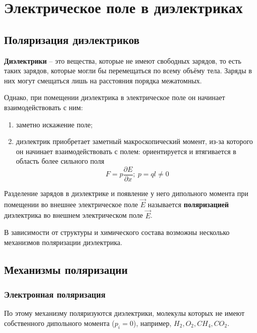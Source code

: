 \chapter{Электрическое поле в диэлектриках}

\section{Поляризация диэлектриков}

    \begin{definition}
        \textbf{Диэлектрики} -- это вещества, которые не имеют свободных
        зарядов, то есть таких зарядов, которые могли бы перемещаться по всему
        объёму тела. Заряды в них могут смещаться лишь на расстояния порядка
        межатомных.
    \end{definition}
    
    Однако, при помещении диэлектрика в электрическое поле он начинает
    взаимодействовать с ним:
    
    \begin{enumerate}
        \item заметно искажение поле;
        \item диэлектрик приобретает заметный макроскопический момент, из-за
            которого он начинает взаимодействовать с полем: ориентируется и
            втягивается в область более сильного поля
            \[
                F = p\frac{\partial E}{\partial x}; \ p = ql \ne 0
            \]        
    \end{enumerate}
    
    \begin{definition}
    Разделение зарядов в диэлектрике и появление у него дипольного момента при
    помещении во внешнее электрическое поле \( \vec{E} \) называется
    \textbf{поляризацией} диэлектрика во внешнем электрическом поле
    \( \vec{E} \).
    \end{definition}
    
    В зависимости от структуры и химического состава возможны несколько
    механизмов поляризации диэлектрика.
    
\section{Механизмы поляризации}

\subsection{Электронная поляризация}
    По этому механизму поляризуются диэлектрики, молекулы которых не имеют
    собственного дипольного момента (\( p_i = 0 \)), например,
    \( H_2, O_2, CH_4, CO_2 \).
    
